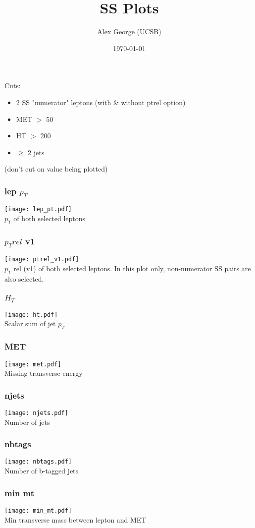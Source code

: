 \documentclass{beamer}
\begin{document}
\title{SS Plots}
\author{Alex George (UCSB)}
\date{\today}

\frame{\titlepage}

\begin{frame}
Cuts:
\begin{itemize}
\item 2 SS "numerator" leptons (with \& without ptrel option)
\item MET $>$ 50
\item HT $>$ 200 
\item $\geq$ 2 jets
\end{itemize}
(don't cut on value being plotted)
\end{frame}

\begin{frame}
\frametitle{lep $p_T$}
\texttt{[image: lep\_pt.pdf]} \\
$p_T$ of both selected leptons
\end{frame}

\begin{frame}
\frametitle{$p_T rel$ v1}
\texttt{[image: ptrel\_v1.pdf]} \\
$p_T$ rel (v1) of both selected leptons.  In this plot only, non-numerator SS pairs are also selected.  
\end{frame}

\begin{frame}
\frametitle{$H_T$}
\texttt{[image: ht.pdf]} \\
Scalar sum of jet $p_T$
\end{frame}

\begin{frame}
\frametitle{MET}
\texttt{[image: met.pdf]} \\
Missing transverse energy
\end{frame}

\begin{frame}
\frametitle{njets}
\texttt{[image: njets.pdf]} \\
Number of jets
\end{frame}

\begin{frame}
\frametitle{nbtags}
\texttt{[image: nbtags.pdf]} \\
Number of b-tagged jets
\end{frame}

\begin{frame}
\frametitle{min mt}
\texttt{[image: min\_mt.pdf]} \\
Min transverse mass between lepton and MET
\end{frame}
\end{document}
